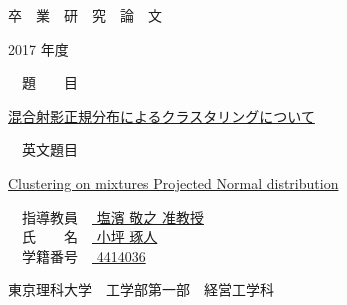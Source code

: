 \documentclass[a4j,11pt]{jarticle}
\begin{document}
\begin{center}
{\Huge 卒　業　研　究　論　文}
\end{center}
\vspace{2cm}
\begin{center}
{\huge 2017 年度}
\end{center}
\vspace{3cm}
\begin{flushleft}
{\huge　題　　目　}
\end{flushleft}
\begin{center}
{\huge \underline{混合射影正規分布によるクラスタリングについて}}\\
\end{center}
\begin{flushleft}
{\huge　英文題目　}
\end{flushleft}
\begin{center}
{\huge \underline{ Clustering on mixtures Projected Normal distribution }}\\
\end{center}
\vspace{5.5cm}
\begin{flushleft}
{\huge　指導教員　\underline{ 塩濱 敬之 准教授 }}\\
\vspace{5mm}
{\huge　氏　　名　\underline{ 小坪 琢人 }}\\
\vspace{5mm}
{\huge　学籍番号　\underline{ 4414036 }}
\end{flushleft}
\vspace{2cm}
\begin{flushright}
{\LARGE 東京理科大学　工学部第一部　経営工学科}\\
\end{flushright}
\end{document}
